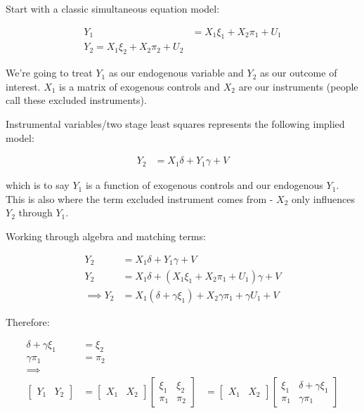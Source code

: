 \documentclass{article}
\begin{document}
   


Start with a classic simultaneous equation model:

\begin{align*}
    Y_1 &= X_1 \xi_1 + X_2 \pi_1 + U_1 \\
    Y_2 = X_1 \xi_2 + X_2 \pi_2 + U_2
\end{align*}

We're going to treat $Y_1$ as our endogenous variable and $Y_2$ as our outcome 
of interest. $X_1$ is a matrix of exogenous controls and $X_2$ are our instruments 
(people call these excluded instruments).

Instrumental variables/two stage least squares represents the following implied model:

\begin{align*}
    Y_2 &= X_1 \delta + Y_1 \gamma + V
\end{align*}


which is to say $Y_1$ is a function of exogenous controls and our endogenous $Y_1$. 
This is also where the term excluded instrument comes from - $X_2$ only influences 
$Y_2$ through $Y_1$.


Working through algebra and matching terms:

\begin{align*}
    Y_2 &= X_1 \delta + Y_1 \gamma + V \\
    Y_2 &= X_1 \delta + (X_1 \xi_1 + X_2 \pi_1 + U_1) \gamma + V \\
    \implies Y_2 &= X_1 (\delta + \gamma \xi_1) + X_2 \gamma \pi_1 + \gamma U_1 + V
\end{align*}

Therefore:

\begin{align*}
    \delta + \gamma \xi_1 &= \xi_2 \\
    \gamma \pi_1 &= \pi_2  \\
    \implies \\
    \begin{bmatrix}
        Y_1 & Y_2
    \end{bmatrix} &= \begin{bmatrix}
        X_1 & X_2
    \end{bmatrix}
    \begin{bmatrix}
        \xi_1 & \xi_2 \\
        \pi_1 & \pi_2
    \end{bmatrix} 
     &= \begin{bmatrix}
        X_1 & X_2
    \end{bmatrix}
    \begin{bmatrix}
        \xi_1 &  \delta + \gamma \xi_1 \\
        \pi_1 & \gamma \pi_1
    \end{bmatrix} 
\end{align*}
\end{document}

